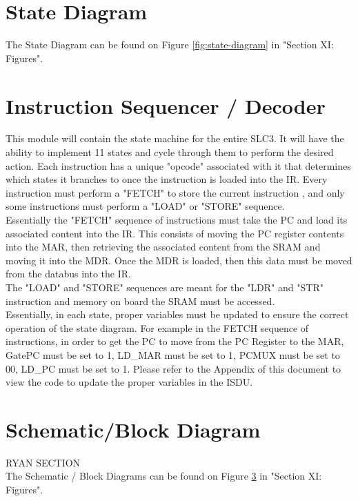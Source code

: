 \documentclass[journal, twocolumn, final,11pt,letterpaper]{IEEEtran}
\begin{document}
\section{State Diagram}
The State Diagram can be found on Figure \ref{fig:state-diagram} in "Section XI: Figures".

\section{Instruction Sequencer / Decoder}
This module will contain the state machine for the entire SLC3. It will have the ability to implement 11 states and cycle through them to perform the desired action. Each instruction has a unique "opcode" associated with it that determines which states it branches to once the instruction is loaded into the IR.  Every instruction must perform a "FETCH" to store the current instruction , and only some instructions must perform a "LOAD" or "STORE" sequence. \\

Essentially the "FETCH" sequence of instructions must take the PC and load its associated content into the IR. This consists of moving the PC register contents into the MAR, then retrieving the associated content from the SRAM and moving it into the MDR. Once the MDR is loaded, then this data must be moved from the databus into the IR. \\

The "LOAD" and "STORE" sequences are meant for the "LDR" and "STR" instruction and memory on board the SRAM must be accessed. \\

Essentially, in each state, proper variables must be updated to ensure the correct operation of the state diagram. For example in the FETCH sequence of instructions, in order to get the PC to move from the PC Register to the MAR, GatePC must be set to 1, LD\_MAR must be set to 1, PCMUX must be set to 00, LD\_PC must be set to 1. Please refer to the Appendix of this document to view the code to update the proper variables in the ISDU. 

\section{Schematic/Block Diagram}
RYAN SECTION\\

The Schematic / Block Diagrams can be found on Figure \ref{} in "Section XI: Figures".
\end{document}
